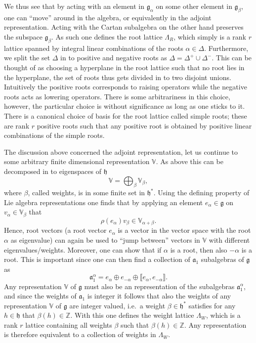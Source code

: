 We thus see that by acting with an element in $\mathfrak{g}_\alpha$ on some other element in $\mathfrak{g}_\beta$, one can ``move'' around in the algebra, or equivalently in the adjoint representation. Acting with the Cartan subalgebra on the other hand preserves the subspace $\mathfrak{g}_\beta$. As such one defines the root lattice $\Lambda_R$, which simply is a rank $r$ lattice spanned by integral linear combinations of the roots $\alpha\in\Delta$. Furthermore, we split the set $\Delta$ in to positive and negative roots as $\Delta = \Delta^+\cup\Delta^-$. This can be thought of as choosing a hyperplane in the root lattice such that no root lies in the hyperplane, the set of roots thus gets divided in to two disjoint unions. Intuitively the positive roots corresponds to raising operators while the negative roots acts as lowering operators. There is some arbitrariness in this choice, however, the particular choice is without significance as long as one sticks to it. There is a canonical choice of basis for the root lattice called simple roots; these are rank $r$ positive roots such that any positive root is obtained by positive linear combinations of the simple roots. 

The discussion above concerned the adjoint representation, let us continue to some arbitrary finite dimensional representation $\mathbb{V}$. As above this can be decomposed in to eigenspaces of $\mathfrak{h}$
\begin{equation}
    \mathbb{V} = \bigoplus_\beta \mathbb{V}_\beta,
\end{equation}
where $\beta$, called weights, is in some finite set in $\mathfrak{h}^*$. Using the defining property of Lie algebra representations one finds that by applying an element $e_\alpha\in\mathfrak{g}$ on $v_\alpha\in\mathbb{V}_\beta$ that 
\begin{equation}
    \rho(e_\alpha)v_\beta \in \mathbb{V}_{\alpha+\beta}.
\end{equation}
Hence, root vectors (a root vector $e_\alpha$ is a vector in the vector space with the root $\alpha$ as eigenvalue) can again be used to ``jump between'' vectors in $\mathbb{V}$ with different eigenvalues/weights. Moreover, one can show that if $\alpha$ is a root, then also $-\alpha$ is a root. This is important since one can then find a collection of $\mathfrak{a}_1$ subalgebras of $\mathfrak{g}$ as 
\begin{equation}
    \mathfrak{a}_1^\alpha = e_\alpha \oplus e_{-\alpha} \oplus \llbracket e_\alpha,e_{-\alpha}\rrbracket.
\end{equation}
Any representation $\mathbb{V}$ of $\mathfrak{g}$ must also be an representation of the subalgebras $\mathfrak{a}_1^\alpha$, and since the weights of $\mathfrak{a}_1$ is integer it follows that also the weights of any representation $\mathbb{V}$ of $\mathfrak{g}$ are integer valued, i.e.\ a weight $\beta\in\mathfrak{h}^*$ satisfies for any $h\in\mathfrak{h}$ that $\beta(h)\in\mathbb{Z}$. With this one defines the weight lattice $\Lambda_W$, which is a rank $r$ lattice containing all weights $\beta$ such that $\beta(h)\in\mathbb{Z}$. Any representation is therefore equivalent to a collection of weights in $\Lambda_W$. 


